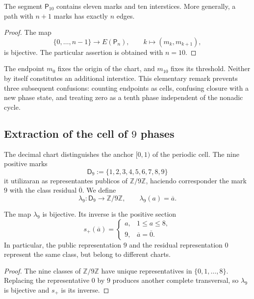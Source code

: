 \begin{lemma}
\label{p12-83-c1-s4:lem:censo-marcas-intersticios}
The segment \(\mathsf P_{10}\) contains eleven marks and ten interstices. More generally, a path with \(n+1\) marks has exactly \(n\) edges.
\end{lemma}

\begin{proof}
The map
\[
 \{0,\ldots,n-1\}\longrightarrow E(\mathsf P_n),
 \qquad k\longmapsto(m_k,m_{k+1}),
\]
is bijective. The particular assertion is obtained with \(n=10\).
\end{proof}

The endpoint \(m_0\) fixes the origin of the chart, and \(m_{10}\) fixes its threshold. Neither by itself constitutes an additional interstice. This elementary remark prevents three subsequent confusions: counting endpoints as cells, confusing closure with a new phase state, and treating zero as a tenth phase independent of the nonadic cycle.

\subsection{Extraction of the cell of \(9\) phases}

The decimal chart distinguishes the anchor \([0,1)\) of the periodic cell. The
nine positive marks
\[
 \mathsf D_9:=\{1,2,3,4,5,6,7,8,9\}
\]
it utilizaran as representantes publicos of
\(\mathbb Z/9\mathbb Z\), haciendo corresponder the mark \(9\) with the class
residual \(\overline 0\). We define
\[
 \lambda_9:\mathsf D_9\longrightarrow\mathbb Z/9\mathbb Z,
 \qquad \lambda_9(a)=\overline a.
\]

\begin{proposition}
\label{p12-83-c1-s4:prop:carta-positiva-nonadica}
The map \(\lambda_9\) is bijective. Its inverse is the positive section
\[
 s_+(\overline a)=
 \begin{cases}
 a,&1\leq a\leq8,\\
 9,&\overline a=\overline0.
 \end{cases}
\]
In particular, the public representation \(9\) and the residual representation \(0\)
represent the same class, but belong to different charts.
\end{proposition}

\begin{proof}
The nine classes of \(\mathbb Z/9\mathbb Z\) have unique representatives in
\(\{0,1,\ldots,8\}\). Replacing the representative \(0\) by \(9\) produces
another complete transversal, so \(\lambda_9\) is bijective and \(s_+\)
is its inverse.
\end{proof}

